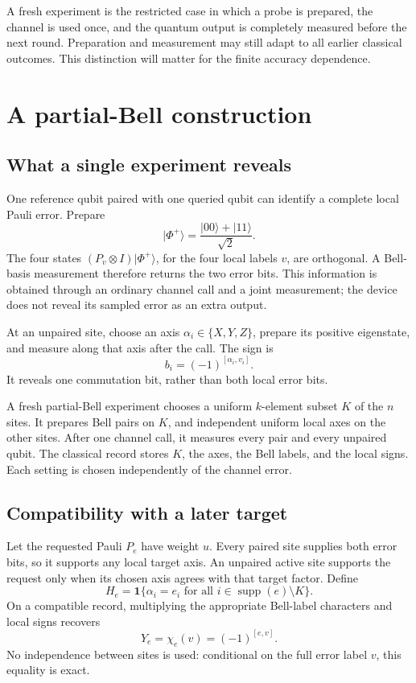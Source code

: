 \documentclass[11pt,a4paper]{article}
\numberwithin{equation}{section}
\theoremstyle{definition}
\theoremstyle{remark}
\begin{document}
A fresh experiment is the restricted case in which a probe is prepared, the channel is used once, and the quantum output is completely measured before the next round. Preparation and measurement may still adapt to all earlier classical outcomes. This distinction will matter for the finite accuracy dependence.

\section{A partial-Bell construction}
\subsection{What a single experiment reveals}
One reference qubit paired with one queried qubit can identify a complete local Pauli error. Prepare
\[
 |\Phi^+\rangle=\frac{|00\rangle+|11\rangle}{\sqrt2}.
\]
The four states \((P_v\otimes I)|\Phi^+\rangle\), for the four local labels \(v\), are orthogonal. A Bell-basis measurement therefore returns the two error bits. This information is obtained through an ordinary channel call and a joint measurement; the device does not reveal its sampled error as an extra output.

At an unpaired site, choose an axis \(\alpha_i\in\{X,Y,Z\}\), prepare its positive eigenstate, and measure along that axis after the call. The sign is
\begin{equation}
 b_i=(-1)^{[\alpha_i,v_i]}.
\end{equation}
It reveals one commutation bit, rather than both local error bits.

A fresh partial-Bell experiment chooses a uniform \(k\)-element subset \(K\) of the \(n\) sites. It prepares Bell pairs on \(K\), and independent uniform local axes on the other sites. After one channel call, it measures every pair and every unpaired qubit. The classical record stores \(K\), the axes, the Bell labels, and the local signs. Each setting is chosen independently of the channel error.

\subsection{Compatibility with a later target}
Let the requested Pauli \(P_e\) have weight \(u\). Every paired site supplies both error bits, so it supports any local target axis. An unpaired active site supports the request only when its chosen axis agrees with that target factor. Define
\begin{equation}
 H_e=\mathbf 1\{\alpha_i=e_i\text{ for all }i\in\operatorname{supp}(e)\setminus K\}.
\end{equation}
On a compatible record, multiplying the appropriate Bell-label characters and local signs recovers
\begin{equation}
 Y_e=\chi_e(v)=(-1)^{[e,v]}.
\end{equation}
No independence between sites is used: conditional on the full error label \(v\), this equality is exact.
\end{document}
